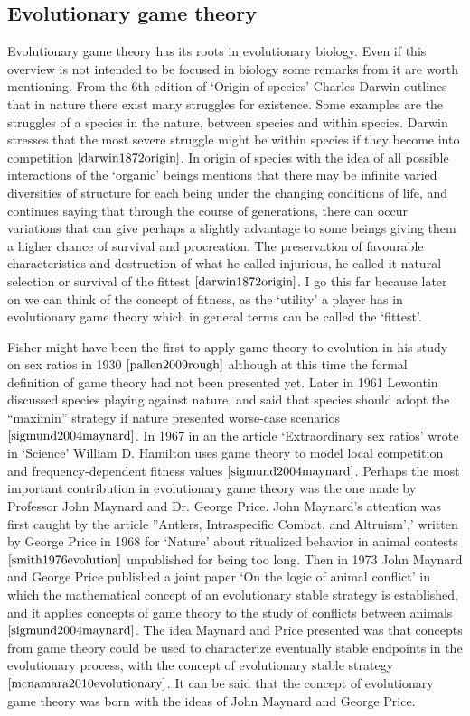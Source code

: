 \documentclass{book}
\begin{document}
\subsection{Evolutionary game theory}\label{EGT}
Evolutionary game theory has its roots in evolutionary biology. Even if this overview is not intended to be focused in biology some remarks from it are worth mentioning. From the 6th edition of ‘Origin of species’ Charles Darwin outlines that in nature there exist many struggles for existence. Some examples are the struggles of a species in the nature, between species and within species. Darwin stresses that the most severe struggle might be within species if they become into competition $\cite{darwin1872origin}$. In origin of species with the idea of all possible interactions of the `organic’ beings mentions that there may be infinite varied diversities of structure for each being under the changing conditions of life, and continues saying that through the course of generations, there can occur variations that can give perhaps a slightly advantage to some beings giving them a higher chance of survival and procreation. The preservation of favourable characteristics and destruction of what he called injurious, he called it natural selection or survival of the fittest $\cite{darwin1872origin}$. I go this far because later on we can think of the concept of fitness, as the ‘utility’ a player has in evolutionary game theory which in general terms can be called the ‘fittest’.

Fisher might have been the first to apply game theory to evolution in his study on sex ratios in 1930 $\cite{pallen2009rough}$ although at this time the formal definition of game theory had not been presented yet. Later in 1961 Lewontin discussed species playing against nature, and said that species should adopt the ``maximin'' strategy if nature presented worse-case scenarios $\cite{sigmund2004maynard}$. In 1967 in an the article ‘Extraordinary sex ratios’ wrote in ‘Science’ William D. Hamilton uses game theory to model local competition and frequency-dependent fitness values $\cite{sigmund2004maynard}$. Perhaps the most important contribution in evolutionary game theory was the one made by Professor John Maynard and Dr. George Price. John Maynard’s attention was first caught by the article ''Antlers, Intraspecific Combat, and Altruism',' written by George Price in 1968 for `Nature’ about ritualized behavior in animal contests $\cite{smith1976evolution}$ unpublished for being too long. Then in 1973 John Maynard and George Price published a joint paper ‘On the logic of animal conflict’ in which the mathematical concept of an evolutionary stable strategy is established, and it applies concepts of game theory to the study of conflicts between animals $\cite{sigmund2004maynard}$.  The idea Maynard and Price presented was that concepts from game theory could be used to characterize eventually stable endpoints in the evolutionary process, with the concept of evolutionary stable strategy $\cite{mcnamara2010evolutionary}$. It can be said that the concept of evolutionary game theory was born with the ideas of John Maynard and George Price.
\end{document}
